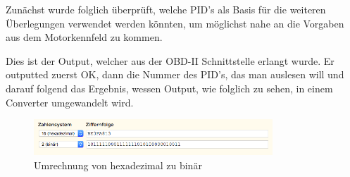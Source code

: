 Zunächst wurde folglich überprüft, welche PID's als Basis für die weiteren Überlegungen verwendet werden könnten, um möglichst nahe an die Vorgaben aus dem Motorkennfeld zu kommen.


Dies ist der Output, welcher aus der OBD-II Schnittstelle erlangt wurde. Er outputted zuerst OK, dann die Nummer des PID's, das man auslesen will und darauf folgend das Ergebnis, wessen Output, wie folglich zu sehen, in einem Converter umgewandelt wird.
\begin{figure}[!htb]\centering
		\includegraphics[width=0.8\textwidth]{images/hextoBinary}
		\caption{Umrechnung von hexadezimal zu binär\cite{SIMR.CH3-schaltvorschlag.hextoBinaryConverter}} \label{fig:imghextoBinary}
\end{figure}

